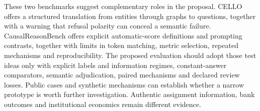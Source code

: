 These two benchmarks suggest complementary roles in the proposal. CELLO
offers a structured translation from entities through graphs to questions,
together with a warning that refusal polarity can conceal a semantic failure.
CausalReasonBench offers explicit automatic-score definitions and prompting
contrasts, together with limits in token matching, metric selection, repeated
mechanisms and reproducibility. The proposed evaluation should adopt those
test ideas only with explicit labels and information regimes, constant-answer
comparators, semantic adjudication, paired mechanisms and declared review
losses. Public cases and synthetic mechanisms can establish whether a narrow
prototype is worth further investigation. Authentic assignment information,
bank outcomes and institutional economics remain different evidence.
\citep{exec17_benchmark_cello,exec17_benchmark_cherif}
\label{exec17:benchmark-development-end}
